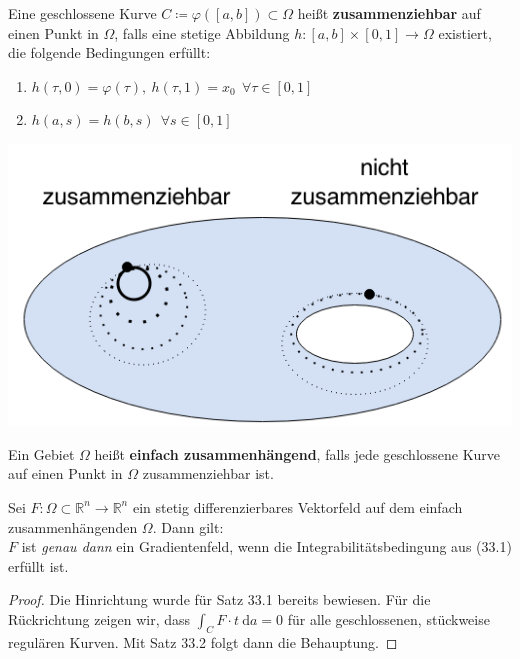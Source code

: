 \begin{definition}[Zusammenziehbarkeit]
Eine geschlossene Kurve $C\coloneqq\varphi([a,b])\subset\Omega$ 
heißt \textbf{zusammenziehbar} auf einen Punkt in $\Omega$, 
falls eine stetige Abbildung $h:[a,b]\times[0,1]\rightarrow\Omega$ existiert, die folgende Bedingungen erfüllt:
\begin{enumerate}
	\item $h(\tau,0)=\varphi(\tau),\ h(\tau,1)=x_0 \ \ \forall
			\tau\in[0,1]$
	\item $h(a,s)=h(b,s) \ \ \forall s\in[0,1]$
\end{enumerate}
\begin{center}
	\includegraphics[scale=0.5]{pictures/010-04.png}
\end{center}
\end{definition}

\begin{definition}
Ein Gebiet $\Omega$ heißt \textbf{einfach zusammenhängend}, 
falls jede geschlossene Kurve auf einen Punkt in $\Omega$ 
zusammenziehbar ist.
\end{definition}

\begin{satz}
Sei $F:\Omega\subset\mathbb{R}^n\rightarrow\mathbb{R}^n$ ein 
stetig differenzierbares Vektorfeld auf dem einfach 
zusammenhängenden $\Omega$. Dann gilt:\\
$F$ ist \emph{genau dann} ein Gradientenfeld, wenn die 
Integrabilitätsbedingung aus (33.1) erfüllt ist.
\end{satz}

\begin{proof}
Die Hinrichtung wurde für Satz 33.1 bereits bewiesen. Für die 
Rückrichtung zeigen wir, dass $\int_CF\cdot t\ \mathrm{d}a = 0$ für alle geschlossenen, stückweise regulären Kurven. Mit Satz 33.2 folgt dann die Behauptung.
\end{proof}

